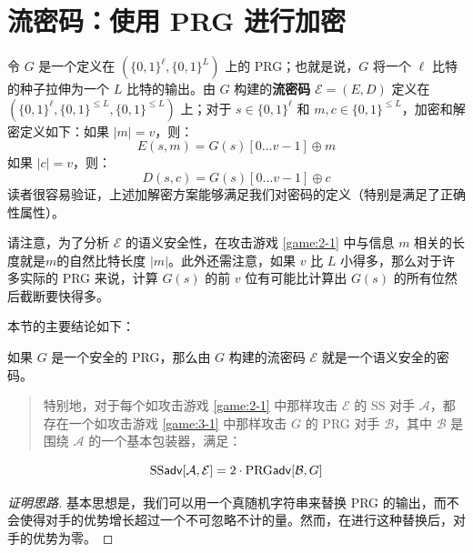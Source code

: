 \section{流密码：使用 PRG 进行加密}

令 $G$ 是一个定义在 $(\{0,1\}^\ell,\{0,1\}^L)$ 上的 PRG；也就是说，$G$ 将一个 $\ell$ 比特的种子拉伸为一个 $L$ 比特的输出。由 $G$ 构建的\textbf{流密码} $\mathcal E=(E,D)$ 定义在 $(\{0,1\}^\ell,\{0,1\}^{\leq L},\{0,1\}^{\leq L})$ 上；对于 $s\in\{0,1\}^\ell$ 和 $m,c\in\{0,1\}^{\leq L}$，加密和解密定义如下：如果 $|m|=v$，则：
$$
E(s,m)=G(s)[0\dots v-1]\oplus m
$$
如果 $|c| = v$，则：
$$
D(s,c)=G(s)[0\dots v-1]\oplus c
$$
读者很容易验证，上述加解密方案能够满足我们对密码的定义（特别是满足了正确性属性）。

请注意，为了分析 $\mathcal E$ 的语义安全性，在攻击游戏 \ref{game:2-1} 中与信息 $m$ 相关的长度就是$m$的自然比特长度 $|m|$。此外还需注意，如果 $v$ 比 $L$ 小得多，那么对于许多实际的 PRG 来说，计算 $G(s)$ 的前 $v$ 位有可能比计算出 $G(s)$ 的所有位然后截断要快得多。

本节的主要结论如下：

\begin{theorem}\label{theo:3-1}
如果 $G$ 是一个安全的 PRG，那么由 $G$ 构建的流密码 $\mathcal E$ 就是一个语义安全的密码。
\begin{quote}
特别地，对于每个如攻击游戏 \ref{game:2-1} 中那样攻击 $\mathcal E$ 的 SS 对手 $\mathcal A$，都存在一个如攻击游戏 \ref{game:3-1} 中那样攻击 $G$ 的 PRG 对手 $\mathcal B$，其中 $\mathcal B$ 是围绕 $\mathcal A$ 的一个基本包装器，满足：
\end{quote}
\begin{equation}\label{eq:3-2}
{\rm SS\mathsf{adv}}[\mathcal{A},\mathcal{E}]=2\cdot{\rm PRG\mathsf{adv}}[\mathcal{B},G]
\end{equation}
\end{theorem}

\begin{proof}[证明思路]
基本思想是，我们可以用一个真随机字符串来替换 PRG 的输出，而不会使得对手的优势增长超过一个不可忽略不计的量。然而，在进行这种替换后，对手的优势为零。
\end{proof}

